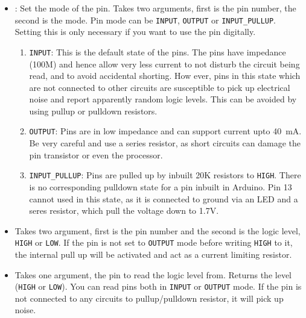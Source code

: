 \documentclass{article}
\begin{document}
		\begin{itemize}

			\item {}: Set the mode of the pin. Takes two arguments, first is the pin number, the second is the mode. Pin mode can be \texttt{INPUT}, \texttt{OUTPUT} or \texttt{INPUT\_PULLUP}. Setting this is only necessary if you want to use the pin digitally.
			\begin{enumerate}
				
				\item[] \texttt{INPUT}: This is the default state of the pins. The pins have impedance (100M) and hence allow very less current to not disturb the circuit being read, and to avoid accidental shorting. How ever, pins in this state which are not connected to other circuits are susceptible to pick up electrical noise and report apparently random logic levels. This can be avoided by using pullup or pulldown resistors.

				\item[] \texttt{OUTPUT}: Pins are in low impedance and can support current upto 40~mA. Be very careful and use a series resistor, as short circuits can damage the pin transistor or even the processor.

				\item[] \texttt{INPUT\_PULLUP}: Pins are  pulled up by inbuilt 20K resistors to \texttt{HIGH}. There is no corresponding pulldown state for a pin inbuilt in Arduino. Pin 13 cannot used in this state, as it is connected to ground via an LED and a seres resistor, which pull the voltage down to 1.7V. 

			\end{enumerate}

			\item {} Takes two argument, first is the pin number and the second is the logic level, \texttt{HIGH} or \texttt{LOW}. If the pin is not set to \texttt{OUTPUT} mode before writing \texttt{HIGH} to it, the internal pull up will be activated and act as a current limiting resistor.
			\item {} Takes one argument, the pin to read the logic level from. Returns the level (\texttt{HIGH} or \texttt{LOW}). You can read pins both in \texttt{INPUT} or \texttt{OUTPUT} mode. If the pin is not connected to any circuits to pullup/pulldown resistor, it will pick up noise.

		\end{itemize}
\end{document}
